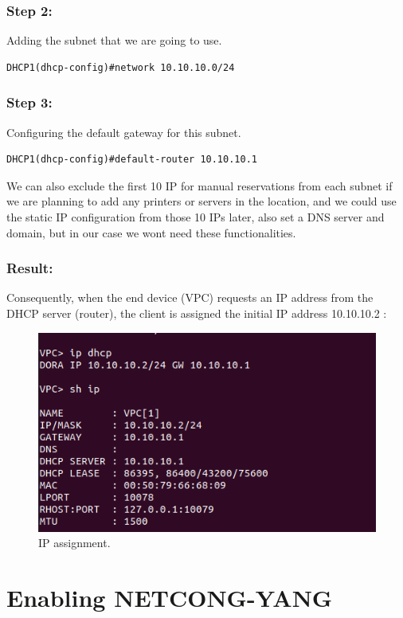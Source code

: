 \subsubsection{Step 2:}
Adding the subnet that we are going to use.
\begin{lstlisting}[style=cliStyle,  backgroundcolor=\color{codebackground}]
                DHCP1(dhcp-config)#network 10.10.10.0/24
\end{lstlisting}

\subsubsection{Step 3:}
Configuring the default gateway for this subnet.
\begin{lstlisting}[style=cliStyle,  backgroundcolor=\color{codebackground}]
                DHCP1(dhcp-config)#default-router 10.10.10.1
\end{lstlisting}

We can also exclude the first 10 IP for manual reservations from each subnet if we are planning to add any printers or servers in the location, and we could use the static IP configuration from those 10 IPs later, also set a DNS server and domain, but in our case we wont need these functionalities.


\subsubsection{Result:}
Consequently, when the end device (VPC) requests an IP address from the DHCP server (router), the client is assigned the initial IP address 10.10.10.2 :
\begin{figure}[h]
    \centering
    \includegraphics[width=0.7\linewidth]{Images/VPC_dhcp.png}
    \caption{IP assignment.}
\end{figure}

\section{Enabling NETCONG-YANG}

